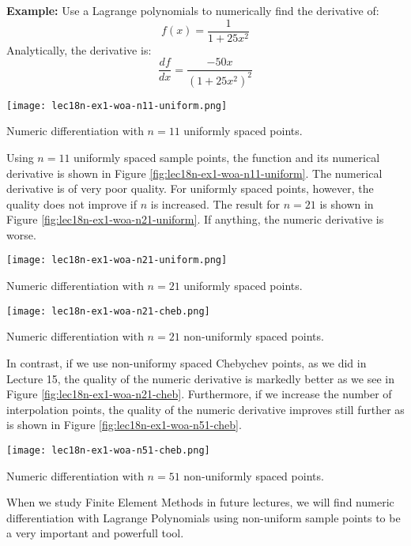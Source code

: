 \noindent\textbf{Example:} Use a Lagrange polynomials to numerically find the derivative of:
\begin{equation}
f(x) = \frac{1}{1+25x^2}
\label{eq:lec18n-f-ex1}
\end{equation}
Analytically, the derivative is:
\begin{equation*}
\frac{df}{dx} = \frac{-50x}{\left(1+25x^2\right)^2}
\end{equation*}
\begin{marginfigure}[-20.0cm]
\texttt{[image: lec18n-ex1-woa-n11-uniform.png]}
\caption{Numeric differentiation with $n=11$ uniformly spaced points.}
\label{fig:lec18n-ex1-woa-n11-uniform}
\end{marginfigure}
Using $n=11$ uniformly spaced sample points, the function and its numerical derivative is shown in Figure \ref{fig:lec18n-ex1-woa-n11-uniform}.  The numerical derivative is of very poor quality. For uniformly spaced points, however, the quality does not improve if $n$ is increased.  The result for $n=21$ is shown in Figure \ref{fig:lec18n-ex1-woa-n21-uniform}. If anything, the numeric derivative is worse.
\begin{marginfigure}[-14.0cm]
\texttt{[image: lec18n-ex1-woa-n21-uniform.png]}
\caption{Numeric differentiation with $n=21$ uniformly spaced points.}
\label{fig:lec18n-ex1-woa-n21-uniform}
\end{marginfigure}
\begin{marginfigure}[-4.0cm]
\texttt{[image: lec18n-ex1-woa-n21-cheb.png]}
\caption{Numeric differentiation with $n=21$ non-uniformly spaced points.}
\label{fig:lec18n-ex1-woa-n21-cheb}
\end{marginfigure}
In contrast, if we use non-uniformy spaced Chebychev points, as we did in Lecture 15, the quality of the numeric derivative is markedly better as we see in Figure \ref{fig:lec18n-ex1-woa-n21-cheb}.  Furthermore, if we increase the number of interpolation points, the quality of the numeric derivative improves still further as is shown in Figure \ref{fig:lec18n-ex1-woa-n51-cheb}.
\begin{marginfigure}[0.0cm]
\texttt{[image: lec18n-ex1-woa-n51-cheb.png]}
\caption{Numeric differentiation with $n=51$ non-uniformly spaced points.}
\label{fig:lec18n-ex1-woa-n51-cheb}
\end{marginfigure}
When we study Finite Element Methods in future lectures, we will find numeric differentiation with Lagrange Polynomials using non-uniform sample points to be a very important and powerfull tool.

